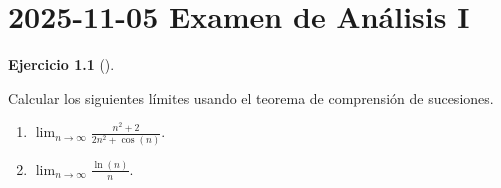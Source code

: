 \documentclass[
  spanish,
  a4paper,
]{scrreport}
\providecommand{\tightlist}{%
  \setlength{\itemsep}{0pt}\setlength{\parskip}{0pt}}
\theoremstyle{definition}
\newtheorem{exercise}{Ejercicio}[chapter]
\theoremstyle{remark}
\begin{document}

\chapter{\texorpdfstring{2025-11-05 Examen de Análisis
I}{2025-11-05  Examen de Análisis I}}\label{examen-de-anuxe1lisis-i-6}

\begin{exercise}[]\protect\hypertarget{exr-1}{}\label{exr-1}

Calcular los siguientes límites usando el teorema de comprensión de
sucesiones.

\begin{enumerate}
\def\labelenumi{\alph{enumi}.}
\tightlist
\item
  \(\displaystyle \lim_{n\to \infty} \frac{n^2+2}{2n^2+\cos(n)}\).
\item
  \(\displaystyle \lim_{n\to \infty} \frac{\ln(n)}{n}\).
\end{enumerate}

\end{exercise}
\end{document}
